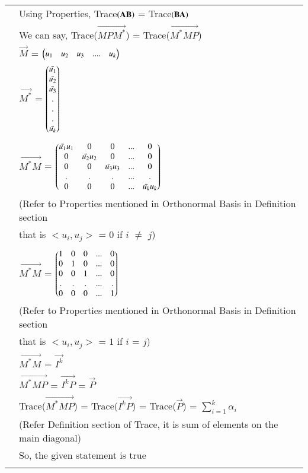 \begin{longtable}{|c|l|}
	& Using Properties, Trace$\mathbf{\left(AB\right)}$ = Trace$\mathbf{\left(BA\right)}$\\
	& We can say, Trace($\vec{MP{M}^*}$) = Trace($\vec{{M}^*MP}$)\\
	& $\vec{M}$ = $\begin{pmatrix}u_1&u_2&u_3&....&u_k\end{pmatrix}$ \\
	& $\vec{M^*}$ = $\begin{pmatrix}\Bar{u_1}\\\Bar{u_2}\\\Bar{u_3}\\.\\.\\.\\\Bar{u_k}\end{pmatrix}$ \\
	&\\
	& $\vec{M^{*}M}$ = $\begin{pmatrix}\Bar{u_1}u_1&0&0&...&0\\
	                           0&\Bar{u_2}u_2&0&...&0\\
	                           0&0&\Bar{u_3}u_3&...&0\\
	                           .&.&.&...&.\\
	                           0&0&0&...&\Bar{u_k}u_k\end{pmatrix}$\\
	 & (Refer to Properties mentioned in Orthonormal Basis in Definition section\\
	 & that is $<u_i,u_j>$ = $0$ if $i$ $\ne$ $j$)\\
	 & \\
	 & $\vec{M^{*}M}$ = $\begin{pmatrix}1&0&0&...&0\\
	                           0&1&0&...&0\\
	                           0&0&1&...&0\\
	                           .&.&.&...&.\\
	                           0&0&0&...&1\end{pmatrix}$\\
	& (Refer to Properties mentioned in Orthonormal Basis in Definition section\\
	& that is $<u_i,u_j>$ = $1$ if $i$ = $j$)\\
    & $\vec{M^*M}$ = $\vec{I^{k}}$\\
    & $\vec{M^*MP}$ = $\vec{I^{k}P}$ = $\vec{P}$\\
    & Trace($\vec{{M}^*MP}$) = Trace($\vec{I^{k}P}$) =  Trace($\vec{P}$) = $\sum_{i=1}^{k}\alpha_i$\\
    & (Refer Definition section of Trace, it is sum of elements on the main diagonal)\\
    & So, the given statement is true \\
	& \\

\end{longtable}
